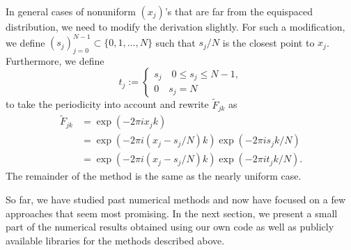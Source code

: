 In general cases of nonuniform $(x_j)$'s that are far from the equispaced distribution,
we need to modify the derivation slightly.
For such a modification, we define $(s_{j})_{j=0}^{N-1} \subset \{0, 1, \dots, N\}$ such that
$s_{j}/N$ is the closest point to $x_{j}$.
Furthermore, we define
\begin{equation}
  t_{j} :=
  \begin{cases}
    s_{j} \quad 0 \le s_{j} \le N-1, \\
    0     \quad s_{j} = N
  \end{cases}
\end{equation}
to take the periodicity into account and rewrite $\tilde{F}_{jk}$ as
\begin{align}
     \tilde{F}_{jk}
  &= \exp(-2\pi i x_j k) \\
  &= \exp(-2\pi i (x_j - s_{j}/N)k)\exp(-2\pi i s_{j}k/N) \\
  &= \exp(-2\pi i (x_j - s_{j}/N)k)\exp(-2\pi i t_{j}k/N).
\end{align}
The remainder of the method is the same as the nearly uniform case.

So far, we have studied past numerical methods and now have focused on a few approaches that seem most promising.
In the next section, we present a small part of the numerical results obtained using our own code as well as publicly available libraries for the methods described above.
